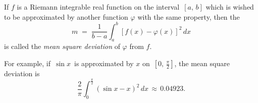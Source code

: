 \documentclass[12pt]{article}
\theoremstyle{definition}
\begin{document}
If $f$ is a Riemann integrable real function on the interval \,$[a,\,b]$ which is wished to be approximated by another function $\varphi$ with the same property, then the 
$$m \;=\; \frac{1}{b\!-\!a}\int_a^b[f(x)\!-\!\varphi(x)]^2\,dx$$
is called the {\em mean square deviation} of $\varphi$ from $f$.

For example, if\, $\sin{x}$\, is approximated by $x$ on\, $[0,\,\frac{\pi}{2}]$, the mean square deviation is 
$$\frac{2}{\pi}\int_0^{\frac{\pi}{2}}(\sin{x}-x)^2\,dx \,\approx\, 0.04923.$$
\end{document}
